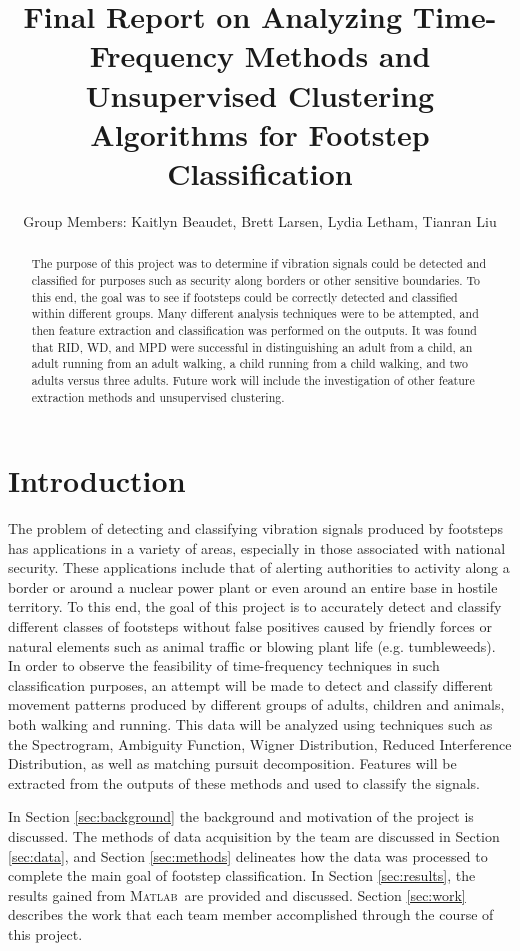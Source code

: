 \documentclass{article}[11pt]
\title{Final Report on Analyzing Time-Frequency Methods and Unsupervised Clustering Algorithms for Footstep Classification}
\author{Group Members: Kaitlyn Beaudet, Brett Larsen, Lydia Letham, Tianran Liu}
\date{}
\newcommand{\Matlab}{\textsc{Matlab}}
\begin{document}
\maketitle
\doublespace


\begin{abstract}
The purpose of this project was to determine if vibration signals could be detected and classified for purposes such as security along borders or other sensitive boundaries. To this end, the goal was to see if footsteps could be correctly detected and classified within different groups. Many different analysis techniques were to be attempted, and then feature extraction and classification was performed on the outputs. It was found that RID, WD, and MPD were successful in distinguishing an adult from a child, an adult running from an adult walking, a child running from a child walking, and two adults versus three adults.  Future work will include the investigation of other feature extraction methods and unsupervised clustering.
\end{abstract}

\section{Introduction}
\label{sec:intro}
The problem of detecting and classifying vibration signals produced by footsteps has applications in a variety of areas, especially in those associated with national security. These applications include that of alerting authorities to activity along a  border or around a nuclear power plant or even around an entire base in hostile territory. To this end, the goal of this project is to accurately detect and classify different classes of footsteps without false positives caused by friendly forces or natural elements such as animal traffic or blowing plant life (e.g. tumbleweeds). In order to observe the feasibility of time-frequency techniques in such classification purposes, an attempt will be made to detect and classify different movement patterns produced by different groups of adults, children and animals, both walking and running. This data will be analyzed using techniques such as the Spectrogram, Ambiguity Function, Wigner Distribution, Reduced Interference Distribution, as well as matching pursuit decomposition. Features will be extracted from the outputs of these methods and used to classify the signals.

In Section \ref{sec:background} the background and motivation of the project is discussed. The methods of data acquisition by the team are discussed in Section \ref{sec:data}, and Section \ref{sec:methods} delineates how the data was processed to complete the main goal of footstep classification.  In Section \ref{sec:results}, the results gained from \Matlab \ are provided and discussed. Section \ref{sec:work} describes the work that each team member accomplished through the course of this project.
\end{document}
